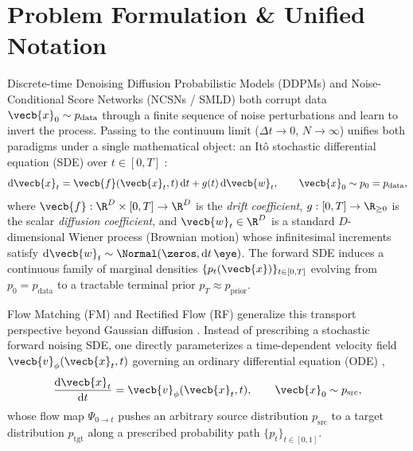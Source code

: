 \documentclass[../../../../master.tex]{subfiles}
\begin{document}

\section{Problem Formulation \& Unified Notation}\label{sec:sde:formulation}

Discrete-time Denoising Diffusion Probabilistic Models (DDPMs) and Noise-Conditional Score Networks (NCSNs / SMLD) both corrupt data $\vecb{x}_0 \sim p_{\mathrm{data}}$ through a finite sequence of noise perturbations and learn to invert the process. Passing to the continuum limit ($\Delta t \to 0$, $N \to \infty$) unifies both paradigms under a single mathematical object: an It\^o stochastic differential equation (SDE) over $t \in [0, T]$   :
\begin{equation}\label{eq:sde:forward_sde}
  \mathrm{d}\vecb{x}_t = \vecb{f}(\vecb{x}_t, t)\,\mathrm{d}t + g(t)\,\mathrm{d}\vecb{w}_t, \qquad \vecb{x}_0 \sim p_0 = p_{\mathrm{data}},
\end{equation}
where $\vecb{f} : \R^D \times [0, T] \to \R^D$ is the \emph{drift coefficient}, $g : [0, T] \to \R_{\ge 0}$ is the scalar \emph{diffusion coefficient}, and $\vecb{w}_t \in \R^D$ is a standard $D$-dimensional Wiener process (Brownian motion) whose infinitesimal increments satisfy $\mathrm{d}\vecb{w}_t \sim \Normal(\zeros, \mathrm{d}t\,\eye)$. The forward SDE induces a continuous family of marginal densities $\{p_t(\vecb{x})\}_{t \in [0, T]}$ evolving from $p_0 = p_{\mathrm{data}}$ to a tractable terminal prior $p_T \approx p_{\mathrm{prior}}$.

Flow Matching (FM) and Rectified Flow (RF) generalize this transport perspective beyond Gaussian diffusion . Instead of prescribing a stochastic forward noising SDE, one directly parameterizes a time-dependent velocity field $\vecb{v}_\phi(\vecb{x}_t, t)$ governing an ordinary differential equation (ODE) ,
\begin{equation}\label{eq:sde:flow_ode}
  \frac{\mathrm{d}\vecb{x}_t}{\mathrm{d}t} = \vecb{v}_\phi(\vecb{x}_t, t), \qquad \vecb{x}_0 \sim p_{\mathrm{src}},
\end{equation}
whose flow map $\Psi_{0 \to t}$ pushes an arbitrary source distribution $p_{\mathrm{src}}$ to a target distribution $p_{\mathrm{tgt}}$ along a prescribed probability path $\{p_t\}_{t \in [0, 1]}$.
\end{document}
